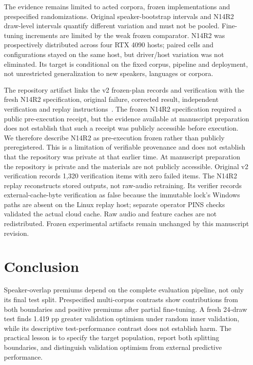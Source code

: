 \documentclass[letterpaper]{article}
\begin{document}
The evidence remains limited to acted corpora, frozen implementations and prespecified randomizations. Original speaker-bootstrap intervals and N14R2 draw-level intervals quantify different variation and must not be pooled. Fine-tuning increments are limited by the weak frozen comparator. N14R2 was prospectively distributed across four RTX 4090 hosts; paired cells and configurations stayed on the same host, but driver/host variation was not eliminated. Its target is conditional on the fixed corpus, pipeline and deployment, not unrestricted generalization to new speakers, languages or corpora.

The repository artifact links the v2 frozen-plan records and verification with the fresh N14R2 specification, original failure, corrected result, independent verification and replay instructions~\cite{artifact}. The frozen N14R2 specification required a public pre-execution receipt, but the evidence available at manuscript preparation does not establish that such a receipt was publicly accessible before execution. We therefore describe N14R2 as pre-execution frozen rather than publicly preregistered. This is a limitation of verifiable provenance and does not establish that the repository was private at that earlier time. At manuscript preparation the repository is private and the materials are not publicly accessible. Original v2 verification records 1,320 verification items with zero failed items. The N14R2 replay reconstructs stored outputs, not raw-audio retraining. Its verifier records external-cache-byte verification as false because the immutable lock's Windows paths are absent on the Linux replay host; separate operator PINS checks validated the actual cloud cache. Raw audio and feature caches are not redistributed. Frozen experimental artifacts remain unchanged by this manuscript revision.

\section{Conclusion}
Speaker-overlap premiums depend on the complete evaluation pipeline, not only its final test split. Prespecified multi-corpus contrasts show contributions from both boundaries and positive premiums after partial fine-tuning. A fresh 24-draw test finds 1.419 pp greater validation optimism under random inner validation, while its descriptive test-performance contrast does not establish harm. The practical lesson is to specify the target population, report both splitting boundaries, and distinguish validation optimism from external predictive performance.
\end{document}
